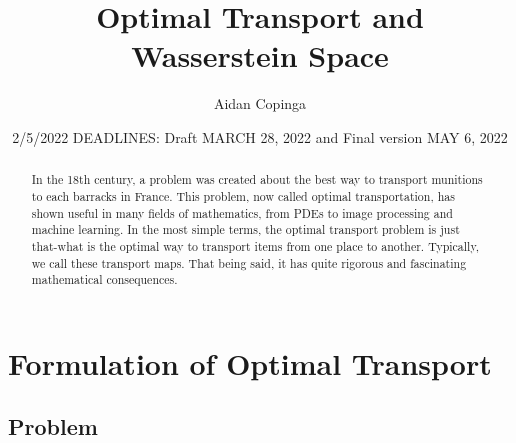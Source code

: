 \documentclass[psamsfonts]{amsart}
\title{Optimal Transport and Wasserstein Space}
\author{Aidan Copinga}
\date{2/5/2022 DEADLINES: Draft MARCH 28, 2022 and Final version MAY 6, 2022}
\theoremstyle{definition}
\numberwithin{equation}{section}
\begin{document}
\begin{abstract}

In the 18th century, a problem was created about the best way to transport munitions to each barracks in France. This problem, now called optimal transportation, has shown useful in many fields of mathematics, from PDEs to image processing and machine learning.
In the most simple terms, the optimal transport problem is just that-what is the optimal way to transport items from one place to another. Typically, we call these transport maps. That being said, it has quite rigorous and fascinating mathematical consequences.

\end{abstract}

\maketitle

\tableofcontents

\section{Formulation of Optimal Transport}
\subsection{Problem}\hfill\\
\end{document}
